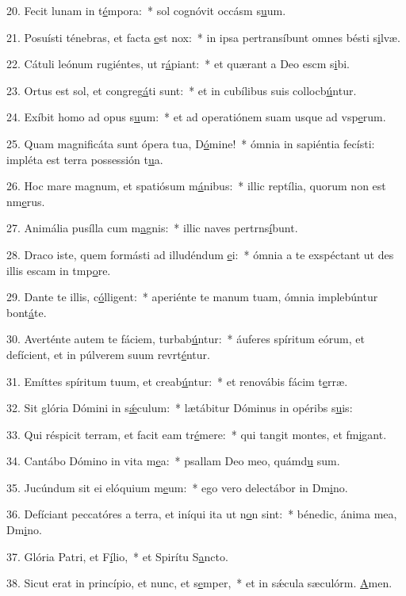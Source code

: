 20. Fecit lunam in t\uline{é}mpora:~* sol cognóvit occásm s\uline{u}um.\par 
21. Posuísti ténebras, et facta \uline{e}st nox:~* in ipsa pertransíbunt omnes bésti s\uline{i}lvæ.\par 
22. Cátuli leónum rugiéntes, ut r\uline{á}piant:~* et quærant a Deo escm s\uline{i}bi.\par 
23. Ortus est sol, et congreg\uline{á}ti sunt:~* et in cubílibus suis collocb\uline{ú}ntur.\par 
24. Exíbit homo ad opus s\uline{u}um:~* et ad operatiónem suam usque ad vsp\uline{e}rum.\par 
25. Quam magnificáta sunt ópera tua, D\uline{ó}mine!~* ómnia in sapiéntia fecísti: impléta est terra possessión t\uline{u}a.\par 
26. Hoc mare magnum, et spatiósum m\uline{á}nibus:~* illic reptília, quorum non est nm\uline{e}rus.\par 
27. Animália pusílla cum m\uline{a}gnis:~* illic naves pertrns\uline{í}bunt.\par 
28. Draco iste, quem formásti ad illudéndum \uline{e}i:~* ómnia a te exspéctant ut des illis escam in tmp\uline{o}re.\par 
29. Dante te illis, c\uline{ó}lligent:~* aperiénte te manum tuam, ómnia implebúntur bont\uline{á}te.\par 
30. Averténte autem te fáciem, turbab\uline{ú}ntur:~* áuferes spíritum eórum, et defícient, et in púlverem suum revrt\uline{é}ntur.\par 
31. Emíttes spíritum tuum, et creab\uline{ú}ntur:~* et renovábis fácim t\uline{e}rræ.\par 
32. Sit glória Dómini in s\uline{ǽ}culum:~* lætábitur Dóminus in opéribs s\uline{u}is:\par 
33. Qui réspicit terram, et facit eam tr\uline{é}mere:~* qui tangit montes, et fm\uline{i}gant.\par 
34. Cantábo Dómino in vita m\uline{e}a:~* psallam Deo meo, quámd\uline{u} sum.\par 
35. Jucúndum sit ei elóquium m\uline{e}um:~* ego vero delectábor in Dm\uline{i}no.\par 
36. Defíciant peccatóres a terra, et iníqui ita ut n\uline{o}n sint:~* bénedic, ánima mea, Dm\uline{i}no.\par 
37. Glória Patri, et F\uline{í}lio,~* et Spirítu S\uline{a}ncto.\par 
38. Sicut erat in princípio, et nunc, et s\uline{e}mper,~* et in sǽcula sæculórm. \uline{A}men.\par 
